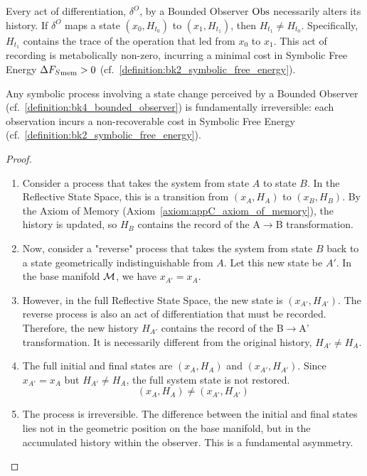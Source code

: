 \begin{axiom}
\label{axiom:appC_axiom_of_memory}
Every act of differentiation, \(\delta^O\), by a Bounded Observer \(\mathrm{Obs}\) necessarily alters its history. If \(\delta^O\) maps a state \((x_0, H_{t_0})\) to \((x_1, H_{t_1})\), then \(H_{t_1} \neq H_{t_0}\). Specifically, \(H_{t_1}\) contains the trace of the operation that led from \(x_0\) to \(x_1\). This act of recording is metabolically non-zero, incurring a minimal cost in Symbolic Free Energy \(\Delta{F_S}_{\text{mem}} > 0\) (cf.~\ref{definition:bk2_symbolic_free_energy}).
\end{axiom}

\begin{theorem}
\label{theorem:appC_fundamental_irreversibility_final}
Any symbolic process involving a state change perceived by a Bounded Observer (cf.~\ref{definition:bk4_bounded_observer}) is fundamentally irreversible: each observation incurs a non-recoverable cost in Symbolic Free Energy (cf.~\ref{definition:bk2_symbolic_free_energy}).
\end{theorem}

\begin{proof}
\label{proof:appC_fundamental_irreversibility}
\leavevmode

\begin{enumerate}
    \item Consider a process that takes the system from state \(A\) to state \(B\). In the Reflective State Space, this is a transition from \((x_A, H_A)\) to \((x_B, H_B)\). By the Axiom of Memory (Axiom~\ref{axiom:appC_axiom_of_memory}), the history is updated, so \(H_B\) contains the record of the A\(\to\)B transformation.

    \item Now, consider a "reverse" process that takes the system from state \(B\) back to a state geometrically indistinguishable from \(A\). Let this new state be \(A'\). In the base manifold \(\mathcal{M}\), we have \(x_{A'} = x_A\).

    \item However, in the full Reflective State Space, the new state is \((x_{A'}, H_{A'})\). The reverse process is also an act of differentiation that must be recorded. Therefore, the new history \(H_{A'}\) contains the record of the B\(\to\)A' transformation. It is necessarily different from the original history, \(H_{A'} \neq H_A\).

    \item The full initial and final states are \((x_A, H_A)\) and \((x_{A'}, H_{A'})\). Since \(x_{A'} = x_A\) but \(H_{A'} \neq H_A\), the full system state is not restored.
    \[
    (x_A, H_A) \neq (x_{A'}, H_{A'})
    \]
    \item The process is irreversible. The difference between the initial and final states lies not in the geometric position on the base manifold, but in the accumulated history within the observer. This is a fundamental asymmetry.
\end{enumerate}
\end{proof}

